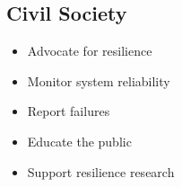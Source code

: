 \subsection{Civil Society}

\begin{itemize}
    \item Advocate for resilience
    \item Monitor system reliability
    \item Report failures
    \item Educate the public
    \item Support resilience research
\end{itemize}

\cleardoublepage
